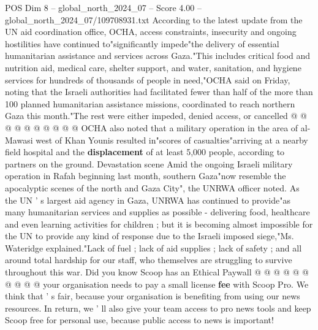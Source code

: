 \begin{textsample}{POS Dim 8 – global\_north\_2024\_07 – Score 4.00 – global\_north\_2024\_07/109708931.txt}
According to the latest update from the UN aid coordination office, OCHA, access constraints, insecurity and ongoing hostilities have continued to"significantly impede"the delivery of essential humanitarian assistance and services across Gaza."This includes critical food and nutrition aid, medical care, shelter support, and water, sanitation, and hygiene services for hundreds of thousands of people in need,"OCHA said on Friday, noting that the Israeli authorities had facilitated fewer than half of the more than 100 planned humanitarian assistance missions, coordinated to reach northern Gaza this month."The rest were either impeded, denied access, or cancelled @ @ @ @ @ @ @ @ @ @ OCHA also noted that a military operation in the area of al-Mawasi west of Khan Younis resulted in"scores of casualties"arriving at a nearby field hospital and the \textbf{displacement} of at least 5,000 people, according to partners on the ground.
Devastation scene Amid the ongoing Israeli military operation in Rafah beginning last month, southern Gaza"now resemble the apocalyptic scenes of the north and Gaza City", the UNRWA officer noted.
As the UN ' s largest aid agency in Gaza, UNRWA has continued to provide"as many humanitarian services and supplies as possible - delivering food, healthcare and even learning activities for children ; but it is becoming almost impossible for the UN to provide any kind of response due to the Israeli imposed siege,"Ms.
Wateridge explained."Lack of fuel ; lack of aid supplies ; lack of safety ; and all around total hardship for our staff, who themselves are struggling to survive throughout this war.
Did you know Scoop has an Ethical Paywall @ @ @ @ @ @ @ @ @ @ your organisation needs to pay a small license \textbf{fee} with Scoop Pro.
We think that ' s fair, because your organisation is benefiting from using our news resources.
In return, we ' ll also give your team access to pro news tools and keep Scoop free for personal use, because public access to news is important!

\end{textsample}
